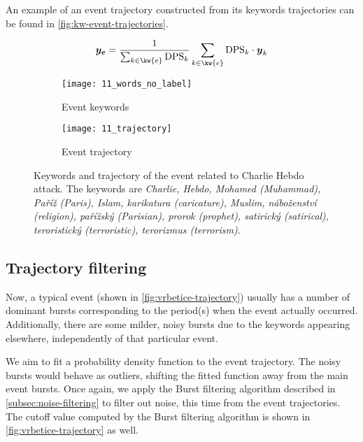 An example of an event trajectory constructed from its keywords trajectories can be found in \autoref{fig:kw-event-trajectories}.

\begin{equation}
	\vect{\traj_{e}} = \frac{1}{\sum_{k \in \kw{e}}{\text{DPS}_{k}}} \sum_{k \in \kw{e}}{\text{DPS}_{k} \cdot \vect{\traj}_{k}}
\end{equation}


\begin{figure}
\centering
\begin{subfigure}{.5\textwidth}
  \centering
  \texttt{[image: 11\_words\_no\_label]}  %
  \caption{Event keywords}
  \label{fig:hebdo-words}
\end{subfigure}%
\begin{subfigure}{.5\textwidth}
  \centering
  \texttt{[image: 11\_trajectory]}  %
  \caption{Event trajectory}
  \label{fig:hebdo-trajectory}
\end{subfigure}
\caption{Keywords and trajectory of the event related to Charlie Hebdo attack. The keywords are \textit{Charlie, Hebdo, Mohamed (Muhammad), Paříž (Paris), Islam, karikatura (caricature), Muslim, náboženství (religion), pařížský (Parisian), prorok (prophet), satirický (satirical), teroristický (terroristic), terorizmus (terrorism)}.}
\label{fig:kw-event-trajectories}
\end{figure}


\subsection{Trajectory filtering} \label{subsec:trajectory-filtering}

Now, a typical event (shown in \autoref{fig:vrbetice-trajectory}) usually has a number of dominant bursts corresponding to the period(s) when the event actually occurred. Additionally, there are some milder, noisy bursts due to the keywords appearing elsewhere, independently of that particular event.

We aim to fit a probability density function to the event trajectory. The noisy bursts would behave as outliers, shifting the fitted function away from the main event bursts. Once again, we apply the Burst filtering algorithm described in \autoref{subsec:noise-filtering} to filter out noise, this time from the event trajectories. The cutoff value computed by the Burst filtering algorithm is shown in \autoref{fig:vrbetice-trajectory} as well.


